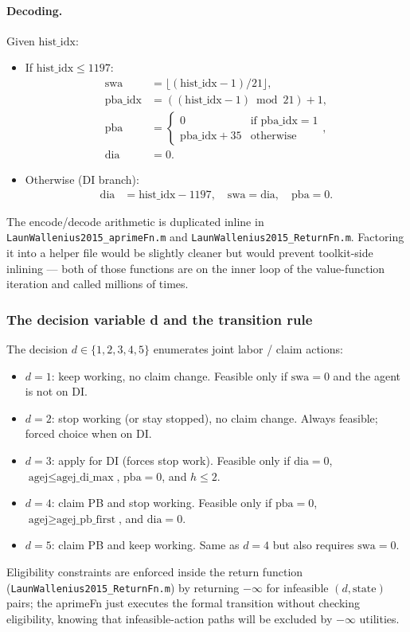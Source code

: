 \paragraph{Decoding.} Given $\text{hist\_idx}$:
\begin{itemize}
 \item If $\text{hist\_idx} \le 1197$:
 \begin{align*}
  \text{swa} &= \lfloor (\text{hist\_idx}-1)/21 \rfloor, \\
  \text{pba\_idx} &= ((\text{hist\_idx}-1) \bmod 21) + 1, \\
  \text{pba} &= \begin{cases} 0 & \text{if } \text{pba\_idx} = 1 \\ \text{pba\_idx} + 35 & \text{otherwise}\end{cases},\\
  \text{dia} &= 0.
 \end{align*}
 \item Otherwise (DI branch):
 \begin{align*}
  \text{dia} &= \text{hist\_idx} - 1197,\quad \text{swa} = \text{dia},\quad \text{pba} = 0.
 \end{align*}
\end{itemize}

The encode/decode arithmetic is duplicated inline in \verb|LaunWallenius2015_aprimeFn.m| and \verb|LaunWallenius2015_ReturnFn.m|. Factoring it into a helper file would be slightly cleaner but would prevent toolkit-side inlining --- both of those functions are on the inner loop of the value-function iteration and called millions of times.

\subsubsection{The decision variable d and the transition rule}

The decision $d \in \{1, 2, 3, 4, 5\}$ enumerates joint labor / claim actions:
\begin{itemize}
 \item $d=1$: keep working, no claim change. Feasible only if $\text{swa} = 0$ and the agent is not on DI.
 \item $d=2$: stop working (or stay stopped), no claim change. Always feasible; forced choice when on DI.
 \item $d=3$: apply for DI (forces stop work). Feasible only if $\text{dia} = 0$, $\text{agej} \le \text{agej\_di\_max}$, $\text{pba} = 0$, and $h \le 2$.
 \item $d=4$: claim PB and stop working. Feasible only if $\text{pba} = 0$, $\text{agej} \ge \text{agej\_pb\_first}$, and $\text{dia} = 0$.
 \item $d=5$: claim PB and keep working. Same as $d=4$ but also requires $\text{swa} = 0$.
\end{itemize}
Eligibility constraints are enforced inside the return function (\verb|LaunWallenius2015_ReturnFn.m|) by returning $-\infty$ for infeasible $(d, \text{state})$ pairs; the aprimeFn just executes the formal transition without checking eligibility, knowing that infeasible-action paths will be excluded by $-\infty$ utilities.

